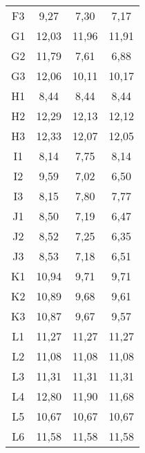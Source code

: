 \begin{center}
\begin{longtable}{cccc}
    F3    & 9,27  & 7,30  & 7,17 \\
    G1    & 12,03 & 11,96 & 11,91 \\
    G2    & 11,79 & 7,61  & 6,88 \\
    G3    & 12,06 & 10,11 & 10,17 \\
    H1    & 8,44  & 8,44  & 8,44 \\
    H2    & 12,29 & 12,13 & 12,12 \\
    H3    & 12,33 & 12,07 & 12,05 \\
    I1    & 8,14  & 7,75  & 8,14 \\
    I2    & 9,59  & 7,02  & 6,50 \\
    I3    & 8,15  & 7,80  & 7,77 \\
    J1    & 8,50  & 7,19  & 6,47 \\
    J2    & 8,52  & 7,25  & 6,35 \\
    J3    & 8,53  & 7,18  & 6,51 \\
    K1    & 10,94 & 9,71  & 9,71 \\
    K2    & 10,89 & 9,68  & 9,61 \\
    K3    & 10,87 & 9,67  & 9,57 \\
    L1    & 11,27 & 11,27 & 11,27 \\
    L2    & 11,08 & 11,08 & 11,08 \\
    L3    & 11,31 & 11,31 & 11,31 \\
    L4    & 12,80 & 11,90 & 11,68 \\
    L5    & 10,67 & 10,67 & 10,67 \\
    L6    & 11,58 & 11,58 & 11,58 \\
\end{longtable}
\end{center}

